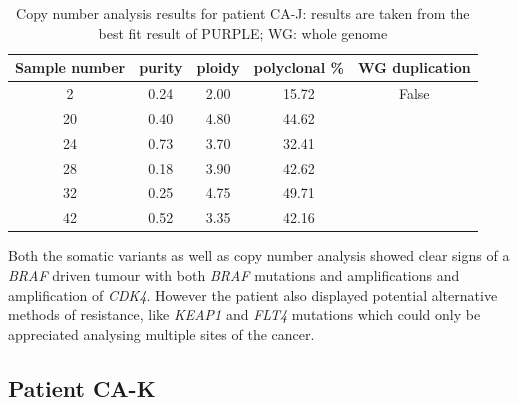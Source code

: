 \begin{table}[ht]
\caption[Copy number analysis results for patient CA-J]{Copy number analysis results for patient CA-J: results are taken from the best fit result of PURPLE; WG: whole genome}\label{tab:ca80cnv}
\centering
{}
\begin{tabular}{|c|c|c|c|c|}
\toprule
\hline
 \rowcolor{gray!50}
\textbf{Sample number} & \textbf{purity} & \textbf{ploidy} & \textbf{polyclonal \%} & \textbf{WG duplication}\\
\hline
 2  & \num{0.24} & \num{2.00} & \num{15.72} & False	\\
 20 & \num{0.40} & \num{4.80} & \num{44.62} & \cellcolor{gray!15} \\
 24 & \num{0.73} & \num{3.70} & \num{32.41} & \cellcolor{gray!15} \\
 28 & \num{0.18} & \num{3.90} & \num{42.62} & \cellcolor{gray!15} \\
 32 & \num{0.25} & \num{4.75} & \num{49.71} & \cellcolor{gray!15} \\
 42 & \num{0.52} & \num{3.35} & \num{42.16} & \cellcolor{gray!15}\multirow{-5}{*}{True} \\
 \hline
\bottomrule
\end{tabular}
\end{table} 


Both the somatic variants as well as copy number analysis showed clear signs of a \textit{BRAF} driven tumour with both \textit{BRAF} mutations and amplifications and amplification of \textit{CDK4}. However the patient also displayed potential alternative methods of resistance, like \textit{KEAP1} and \textit{FLT4} mutations which could only be appreciated analysing multiple sites of the cancer. 



\cleardoublepage



\subsection{Patient CA-K}
\label{cascade-sec:CA82}

